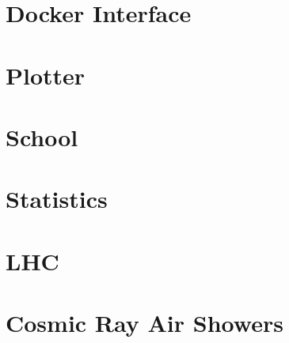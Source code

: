 
\chapter{Docker Interface}


\chapter{Plotter}


\chapter{School}


\chapter{Statistics}


\chapter{LHC}


\chapter{Cosmic Ray Air Showers}


